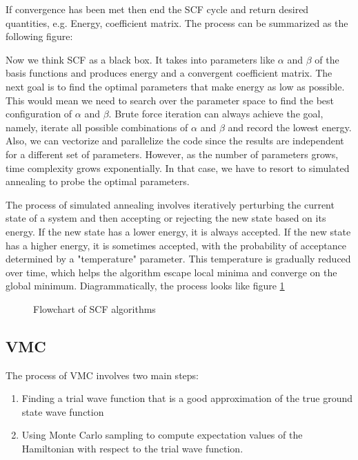 \documentclass[11pt]{article}
\begin{document}
If convergence has been met then end the SCF cycle and return desired quantities, e.g. Energy, coefficient matrix. The process can be summarized as the following figure:


Now we think SCF as a black box. It takes into parameters like $\alpha$ and $\beta$ of the basis functions and produces energy and a convergent coefficient matrix. The next goal is to find the optimal parameters that make energy as low as possible. This would mean we need to search over the parameter space to find the best configuration of $\alpha$ and $\beta$. Brute force iteration can always achieve the goal, namely, iterate all possible combinations of $\alpha$ and $\beta$ and record the lowest energy. Also, we can vectorize and parallelize the code since the results are independent for a different set of parameters. However, as the number of parameters grows, time complexity grows exponentially. In that case, we have to resort to simulated annealing to probe the optimal parameters. \cite{simulated-annealing}

The process of simulated annealing involves iteratively perturbing the current state of a system and then accepting or rejecting the new state based on its energy. If the new state has a lower energy, it is always accepted. If the new state has a higher energy, it is sometimes accepted, with the probability of acceptance determined by a "temperature" parameter. This temperature is gradually reduced over time, which helps the algorithm escape local minima and converge on the global minimum. Diagrammatically, the process looks like figure \ref{fig:scf flowchart}

\begin{figure}
    \centering
    \qquad
    \caption{Flowchart of SCF algorithms}%
    \label{fig:scf flowchart}%
\end{figure}

\subsection{VMC}
The process of VMC involves two main steps: 
\begin{enumerate}
    \item Finding a trial wave function that is a good approximation of the true ground state wave function
    \item Using Monte Carlo sampling to compute expectation values of the Hamiltonian with respect to the trial wave function.
\end{enumerate}
\end{document}
